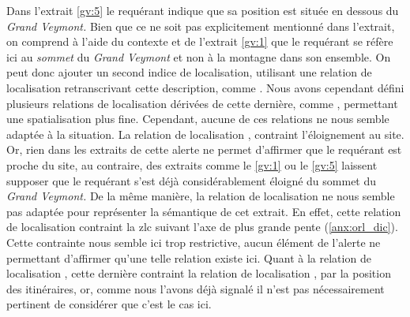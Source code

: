 Dans l'extrait \ref{gv:5} le requérant indique que sa position est
située en dessous du \emph{Grand Veymont.} Bien que ce ne soit pas
explicitement mentionné dans l'extrait, on comprend à l'aide du
contexte et de l'extrait \ref{gv:1} que le requérant se réfère ici au
\emph{sommet} du \emph{Grand Veymont} et non à la montagne dans son
ensemble. On peut donc ajouter un second indice de localisation,
utilisant une relation de localisation retranscrivant cette
description, comme . Nous avons cependant
défini plusieurs relations de localisation dérivées de cette dernière,
comme , permettant une spatialisation plus
fine. Cependant, aucune de ces relations ne nous semble adaptée à la
situation. La relation de localisation ,
contraint l'éloignement au site. Or, rien dans les extraits de cette
alerte ne permet d'affirmer que le requérant est proche du site, au
contraire, des extraits comme le \ref{gv:1} ou le \ref{gv:5} laissent
supposer que le requérant s'est déjà considérablement éloigné du
sommet du \emph{Grand Veymont.} De la même manière, la relation de
localisation  ne nous semble pas
adaptée pour représenter la sémantique de cet extrait. En effet, cette
relation de localisation contraint la \ac{zlc} suivant l'axe de plus
grande pente (\autoref{anx:orl_dic}). Cette contrainte nous semble ici
trop restrictive, aucun élément de l'alerte ne permettant d'affirmer
qu'une telle relation existe ici. Quant à la relation de localisation
, cette dernière contraint la
relation de localisation , par la position
des itinéraires, or, comme nous l'avons déjà signalé il n'est pas
nécessairement pertinent de considérer que c'est le cas ici.

